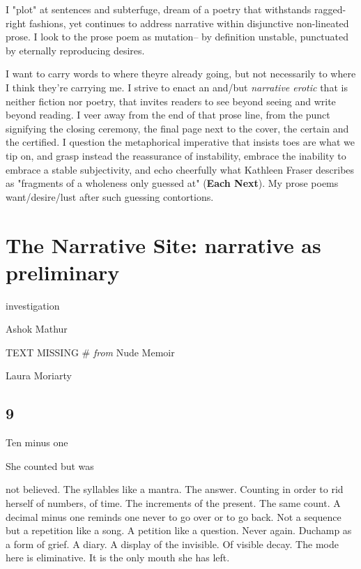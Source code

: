 I "plot" at sentences and subterfuge, dream of a poetry that withstands
ragged-right fashions, yet continues to address narrative within
disjunctive non-lineated prose. I look to the prose poem as mutation--
by definition unstable, punctuated by eternally reproducing desires.

I want to carry words to where theyre already going, but not necessarily
to where I think they're carrying me. I strive to enact an and/but
\emph{narrative erotic} that is neither fiction nor poetry, that invites
readers to see beyond seeing and write beyond reading. I veer away from
the end of that prose line, from the punct signifying the closing
ceremony, the final page next to the cover, the certain and the
certified. I question the metaphorical imperative that insists toes are
what we tip on, and grasp instead the reassurance of instability,
embrace the inability to embrace a stable subjectivity, and echo
cheerfully what Kathleen Fraser describes as "fragments of a wholeness
only guessed at" (\textbf{Each Next}). My prose poems want/desire/lust
after such guessing contortions.

\hypertarget{the-narrative-site-narrative-as-preliminary}{%
\section{The Narrative Site: narrative as
preliminary}\label{the-narrative-site-narrative-as-preliminary}}

investigation

Ashok Mathur

TEXT MISSING \# \emph{from} Nude Memoir

Laura Moriarty

\hypertarget{section-13}{%
\subsection{9}\label{section-13}}

Ten minus one

She counted but was

not believed. The syllables like a mantra. The answer. Counting in order
to rid herself of numbers, of time. The increments of the present. The
same count. A decimal minus one reminds one never to go over or to go
back. Not a sequence but a repetition like a song. A petition like a
question. Never again. Duchamp as a form of grief. A diary. A display of
the invisible. Of visible decay. The mode here is eliminative. It is the
only mouth she has left.

